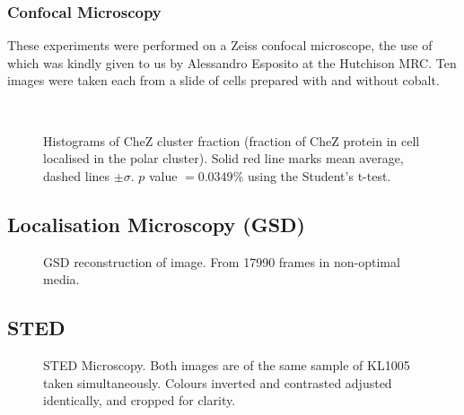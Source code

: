\documentclass[../main.tex]{subfiles}
\begin{document}
\subsubsection{Confocal Microscopy}
\label{sec:results:cs:confocal}
These experiments were performed on a Zeiss confocal microscope, the use of which was kindly given to us by Alessandro Esposito at the Hutchison MRC. Ten images were taken each from a slide of cells prepared with and without cobalt.

\begin{figure}[h!]
\begin{center}
\\
\caption[Image processing results on Zeiss confocal microscope]{Histograms of CheZ cluster fraction (fraction of CheZ protein in cell localised in the polar cluster). Solid red line marks mean average, dashed lines \(\pm\sigma\). \(p\) value \(=0.0349\%\) using the Student's t-test.}
\label{fig:results:zeiss}
\end{center}
\end{figure}
\cleardoublepage

\subsection{Localisation Microscopy (GSD)}

\begin{figure}[h!]
\begin{center}
\caption[GSD reconstruction]{GSD reconstruction of image. From 17990 frames in non-optimal media.}
\label{fig:results:palm}
\end{center}
\end{figure}
\newpage
\subsection{STED}
\begin{figure}[h!]
\begin{center}
\caption[STED microscopy]{STED Microscopy. Both images are of the same sample of KL1005 taken simultaneously. Colours inverted and contrasted adjusted identically, and cropped for clarity.}
\label{fig:results:sted}
\end{center}
\end{figure}
\newpage
\end{document}
